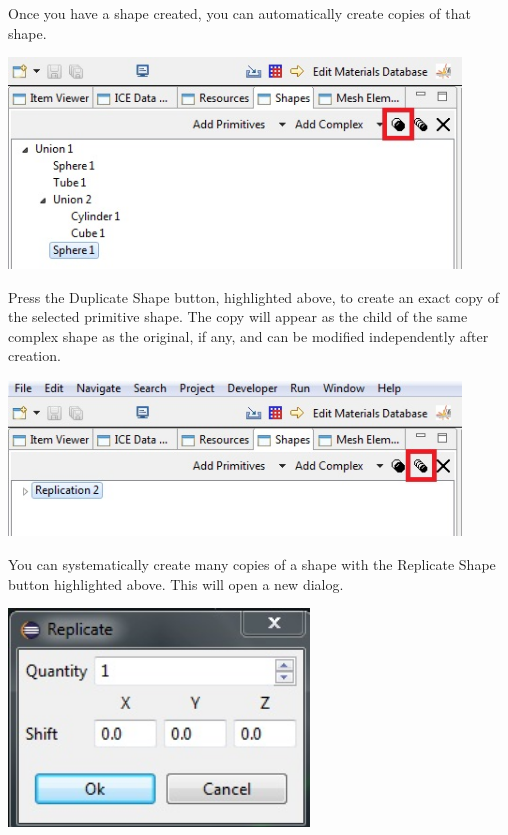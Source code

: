 Once you have a shape created, you can automatically create copies of that
shape. 

\begin{center}
\includegraphics[width=12cm]{images/GeometryDuplicateShape.jpg}
\end{center}

Press the Duplicate Shape button, highlighted above, to create an exact copy of
the selected primitive shape. The copy will appear as the child of the same
complex shape as the original, if any, and can be modified independently after
creation.

\begin{center}
\includegraphics[width=12cm]{images/GeometryReplicateShape.jpg}
\end{center}

You can systematically create many copies of a shape with the Replicate Shape
button highlighted above. This will open a new dialog.

\begin{center}
\includegraphics[width=8cm]{images/GeometryReplicateDialog.jpg}
\end{center}

